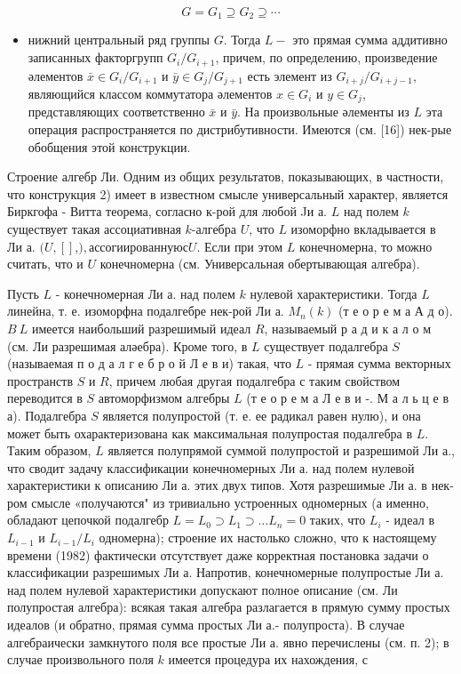 \documentclass[10pt]{article}
\begin{document}
\[

G=G_{1} \supseteq G_{2} \supseteq \cdots

\]



\begin{itemize}

  \item нижний центральный ряд группы $G$. Тогда $L-$ это прямая сумма аддитивно записанных факторгрупп $G_{i} / G_{i+1}$, причем, по определению, произведение әлементов $\bar{x} \in G_{i} / G_{i+1}$ и $\bar{y} \in G_{j} / G_{j+1}$ есть элемент из $G_{i+j} / G_{i+j-1}$, являющийся классом коммутатора әлементов $x \in G_{i}$ и $y \in G_{j}$, представляющих соответственно $\bar{x}$ и $\bar{y}$. На произвольные әлементы из $L$ эта операция распространяется по дистрибутивности. Имеются (см. [16]) нек-рые обобщения этой конструкции.

\end{itemize}



Строение алгебр Ли. Одним из общих результатов, показывающих, в частности, что конструкция 2) имеет в известном смысле универсальный характер, является Биркгофа - Витта теорема, согласно к-рой для любой Jи а. $L$ над полем $k$ существует такая ассоциативная $k$-алгебра $U$, что $L$ изоморфно вкладывается в Ли а. $(U,[]$,$) , ассогиированную с U$. Если при этом $L$ конечномерна, то можно считать, что и $U$ конечномерна (см. Универсальная обертывающая алгебра).



Пусть $L$ - конечномерная Ли а. над полем $k$ нулевой характеристики. Тогда $L$ линейна, т. е. изоморфна подалгебре нек-рой Ли а. $M_{n}(k)$ (т е о р е м а А д о). $B ~ L$ имеется наибольший разрешимый идеал $R$, называемый р а д и к а л о м (см. Ли разрешимая аләебра). Кроме того, в $L$ существует подалгебра $S$ (называемая п о д а л г е б р о й $Л$ е в и) такая, что $L$ - прямая сумма векторных пространств $S$ и $R$, причем любая другая подалгебра с таким свойством переводится в $S$ автоморфизмом алгебры $L$ (т е о р е м а Л е в и -. М а л ь ц е в а). Подалгебра $S$ является полупростой (т. е. ее радикал равен нулю), и она может быть охарактеризована как максимальная полупростая подалгебра в $L$. Таким образом, $L$ является полупрямой суммой полупростой и разрешимой Ли а., что сводит задачу классификации конечномерных Ли а. над полем нулевой характеристики к описанию Ли а. этих двух типов. Хотя разрешимые Ли а. в нек-ром смысле «получаются" из тривиально устроенных одномерных (а именно, обладают цепочкой подалгебр $L=L_{0} \supset L_{1} \supset \ldots L_{n}=0$ таких, что $L_{i}$ - идеал в $L_{i-1}$ и $L_{i-1} / L_{i}$ одномерна); строение их настолько сложно, что к настоящему времени (1982) фактически отсутствует даже корректная постановка задачи о классификации разрешимых Ли а. Напротив, конечномерные полупростые Ли а. над полем нулевой характеристики допускают полное описание (см. Ли полупростая алгебра): всякая такая алгебра разлагается в прямую сумму простых идеалов (и обратно, прямая сумма простых Ли а.- полупроста). В случае алгебраически замкнутого поля все простые Ли а. явно перечислены (см. п. 2); в случае произвольного поля $k$ имеется процедура их нахождения, с
\end{document}
